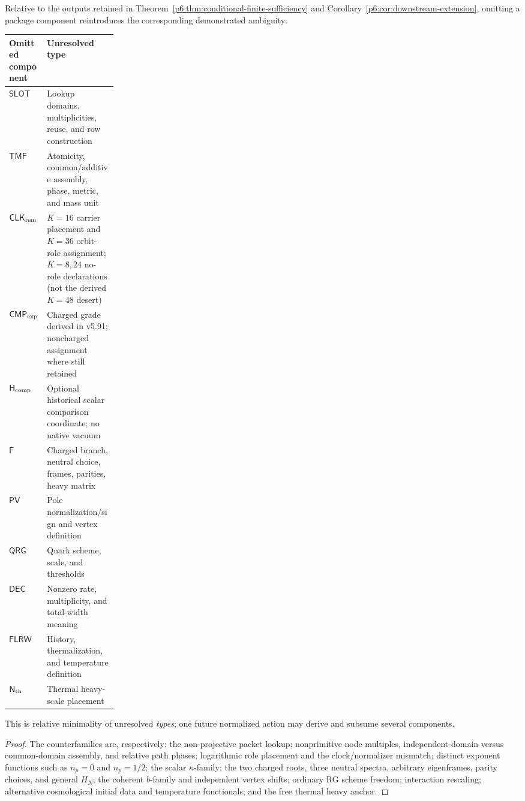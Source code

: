 \documentclass[12pt,a4paper]{article}
\newcommand{\CLKrem}{\mathsf{CLK}_{\rm rem}}
\newcommand{\CMPexp}{\mathsf{CMP}_{\rm exp}}
\begin{document}
\begin{theorem}
\label{p6:thm:relative-minimality}
Relative to the outputs retained in
Theorem~\ref{p6:thm:conditional-finite-sufficiency} and
Corollary~\ref{p6:cor:downstream-extension}, omitting a package component
reintroduces the corresponding demonstrated ambiguity:
\begin{center}
\footnotesize
\setlength{\tabcolsep}{4pt}
\renewcommand{\arraystretch}{1.15}
\begin{tabularx}{\linewidth}{@{}>{\raggedright\arraybackslash}p{0.21\linewidth}
                          >{\raggedright\arraybackslash}X@{}}
\toprule
Omitted component & Unresolved type\\
\midrule
\(\mathsf{SLOT}\)& Lookup domains, multiplicities, reuse, and row construction\\
\(\mathsf{TMF}\)& Atomicity, common/additive assembly, phase, metric, and mass unit\\
\(\CLKrem\)& \(K=16\) carrier placement and \(K=36\) orbit-role assignment;
\(K=8,24\) no-role declarations (not the derived \(K=48\) desert)\\
\(\CMPexp\)& Charged grade derived in v5.91; noncharged assignment where still retained\\
\(\mathsf H_{\rm comp}\)& Optional historical scalar comparison coordinate; no native vacuum\\
\(\mathsf F\)& Charged branch, neutral choice, frames, parities, heavy matrix\\
\(\mathsf{PV}\)& Pole normalization/sign and vertex definition\\
\(\mathsf{QRG}\)& Quark scheme, scale, and thresholds\\
\(\mathsf{DEC}\)& Nonzero rate, multiplicity, and total-width meaning\\
\(\mathsf{FLRW}\)& History, thermalization, and temperature definition\\
\(\mathsf N_{\rm th}\)& Thermal heavy-scale placement\\
\bottomrule
\end{tabularx}
\end{center}
This is relative minimality of unresolved \emph{types}; one future normalized
action may derive and subsume several components.
\end{theorem}

\begin{proof}
The counterfamilies are, respectively: the non-projective packet lookup;
nonprimitive node multiples, independent-domain versus common-domain assembly,
and relative path phases;
logarithmic role placement and the clock/normalizer mismatch; distinct
exponent functions such as \(n_p=0\) and \(n_p=1/2\); the scalar
\(\kappa\)-family; the two charged roots,
three neutral spectra, arbitrary eigenframes, parity choices, and general
\(H_N\); the coherent \(b\)-family and independent vertex shifts; ordinary
RG scheme freedom; interaction rescaling; alternative cosmological initial
data and temperature functionals; and the free thermal heavy anchor.
\end{proof}
\end{document}
